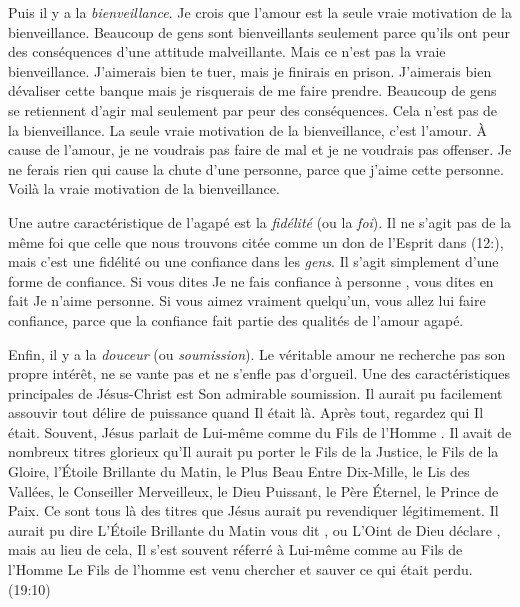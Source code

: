 Puis il y a la \emph{bienveillance}. Je crois que l'amour est la seule
 vraie motivation de la bienveillance.
 Beaucoup de gens sont bienveillants seulement parce qu'ils ont peur
 des conséquences d'une attitude malveillante.
 Mais ce n'est pas la vraie bienveillance.
 \Og J'aimerais bien te tuer, mais je finirais en prison.
 \ocadr J'aimerais bien dévaliser cette banque mais je risquerais
 de me faire prendre. \Fg{}
 Beaucoup de gens se retiennent d'agir mal seulement par peur
 des conséquences. Cela n'est pas de la bienveillance.
 La seule vraie motivation de la bienveillance, c'est l'amour.
 À cause de l'amour, je ne voudrais pas faire de mal
 et je ne voudrais pas offenser. Je ne ferais rien qui cause
 la chute d'une personne, parce que j'aime cette personne.
 Voilà la vraie motivation de la bienveillance.

Une autre caractéristique de l'agapé est la \emph{fidélité}
 (ou la \emph{foi}).
 Il ne s'agit pas de la même foi que celle que nous trouvons citée
 comme un don de l'Esprit dans (12:),
 mais c'est une fidélité ou une confiance dans les \emph{gens}.
 Il s'agit simplement d'une forme de confiance. Si vous dites\frcolon{}
 \Og Je ne fais confiance à personne \Fg{}, vous dites en fait\frcolon{}
 \Og Je n'aime personne. \Fg{}
 Si vous aimez vraiment quelqu'un, vous allez lui faire confiance,
 parce que la confiance fait partie des qualités de l'amour agapé.

Enfin, il y a la \emph{douceur} (ou \emph{soumission}).
 Le véritable amour ne recherche pas son propre intérêt,
 ne se vante pas et ne s'enfle pas d'orgueil.
 Une des caractéristiques principales de Jésus-Christ
 est Son admirable soumission. Il aurait pu facilement assouvir tout délire de puissance
 quand Il était là. Après tout, regardez qui Il était. Souvent, Jésus parlait de Lui-même
 comme du \Og Fils de l'Homme \Fg{}.
 Il avait de nombreux titres glorieux qu'Il aurait pu porter\frcolon{}
 le Fils de la Justice, le Fils de la Gloire, l'Étoile Brillante du Matin,
 le Plus Beau Entre Dix-Mille, le Lis des Vallées,
 le Conseiller Merveilleux, le Dieu Puissant, le Père Éternel,
 le Prince de Paix. Ce sont tous là des titres que Jésus aurait pu revendiquer
 légitimement. Il aurait pu dire\frcolon{}
 \Og L'Étoile Brillante du Matin vous dit \Fg{}, ou\frcolon{}
 \Og L'Oint de Dieu déclare \Fg{}, mais au lieu de cela,
 Il s'est souvent réferré à Lui-même comme au Fils de l'Homme\frcolon{}
 \Og Le Fils de l'homme est venu chercher et sauver
 ce qui était perdu. \Fg{} (19:10)

